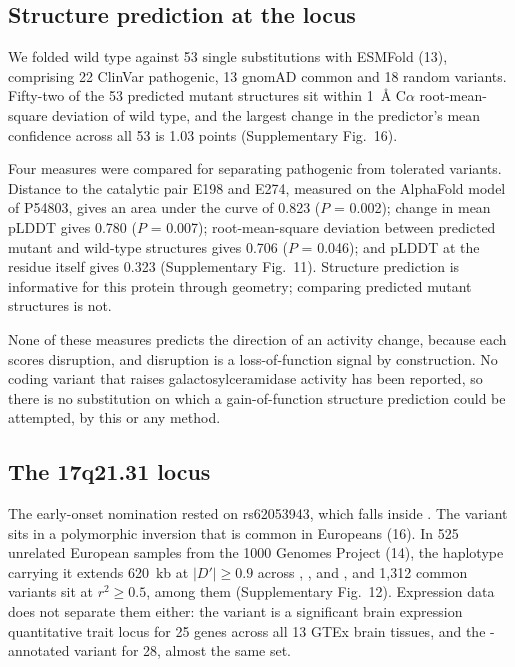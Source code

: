 \documentclass[10pt]{article}
\begin{document}
\subsection*{Structure prediction at the  locus}

We folded  wild type against 53 single substitutions with ESMFold (13), comprising 22 ClinVar
pathogenic, 13 gnomAD common and 18 random variants. Fifty-two of the 53 predicted mutant
structures sit within 1~\AA{} C$\alpha$ root-mean-square deviation of wild type, and the largest change in the predictor's mean confidence across all 53 is 1.03 points (Supplementary Fig.~16).

Four measures were compared for separating pathogenic from tolerated variants. Distance to the
catalytic pair E198 and E274, measured on the AlphaFold model of P54803, gives an area under the
curve of 0.823 ($P$ = 0.002); change in mean pLDDT gives 0.780 ($P$ = 0.007); root-mean-square
deviation between predicted mutant and wild-type structures gives 0.706 ($P$ = 0.046); and pLDDT at
the residue itself gives 0.323 (Supplementary Fig.~11). Structure prediction is informative for this protein through geometry; comparing predicted mutant structures is not.

None of these measures predicts the direction of an activity change, because each scores
disruption, and disruption is a loss-of-function signal by construction. No coding variant that
raises galactosylceramidase activity has been reported, so there is no substitution on which a
gain-of-function structure prediction could be attempted, by this or any method.

\subsection*{The 17q21.31 locus}

The early-onset nomination rested on rs62053943, which falls inside . The variant sits in a polymorphic inversion that is common in Europeans (16). In 525 unrelated European samples from the 1000 Genomes Project (14),
the haplotype carrying it extends 620~kb at $|D'| \geq 0.9$ across , ,
 and , and 1,312 common variants sit at $r^2 \geq 0.5$,  among
them (Supplementary Fig.~12). Expression data does not separate them either: the variant is a significant brain
expression quantitative trait locus for 25 genes across all 13 GTEx brain tissues, and the
-annotated variant for 28, almost the same set.
\end{document}
